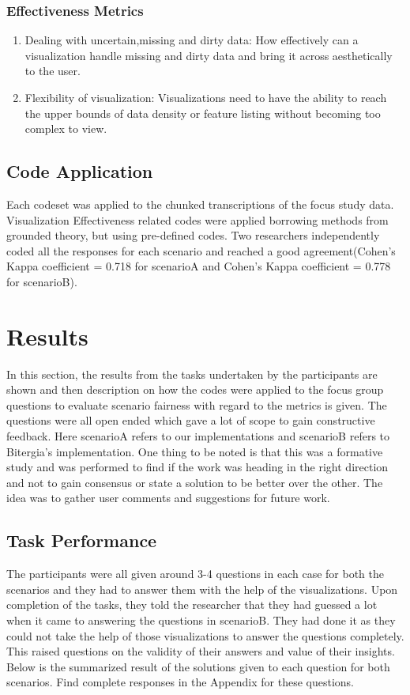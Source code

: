 \documentclass[seploa]{beavtex}
\begin{document}
\subsection{Effectiveness Metrics}

\begin{enumerate}
\item Dealing with uncertain,missing and dirty data: How effectively can a visualization handle missing and dirty data and bring it across aesthetically to the user\cite{grins2001}.

\item Flexibility of visualization: Visualizations need to have the ability to reach the upper bounds of data density or feature listing without becoming too complex to view\cite{grins2001}.
\end{enumerate}

\section{Code Application}
Each codeset was applied to the chunked transcriptions of the focus study data. Visualization Effectiveness related  codes  were  applied borrowing methods from  grounded theory\cite{corbin2008}, but using pre-­defined codes. Two researchers independently coded all the responses for each scenario and reached a good agreement(Cohen’s  Kappa  coefficient  =  0.718 for scenarioA and Cohen’s  Kappa  coefficient  =  0.778 for scenarioB).

\chapter{Results}
In this section, the results from the tasks undertaken by the participants are shown and then description on how the codes were applied to the focus group questions to evaluate scenario fairness with regard to the metrics is given. The questions were all open ended which gave a lot of scope to gain constructive feedback. Here scenarioA refers to our implementations and scenarioB refers to Bitergia's implementation. One thing to be noted is that this was a formative study and was performed to find if the work was heading in the right direction and not to gain consensus or state a solution to be better over the other. The idea was to gather user comments and suggestions for future work.

\section{Task Performance}
The participants were all given around 3-4 questions in each case for both the scenarios and they had to answer them with the help of the visualizations. Upon completion of the tasks, they told the researcher that they had guessed a lot when it came to answering the questions in scenarioB. They had done it as they could not take the help of those visualizations to answer the questions completely. This raised questions on the validity of their answers and value of their insights. Below is the summarized result of the solutions given to each question for both scenarios. Find complete responses in the Appendix for these questions.
\end{document}

